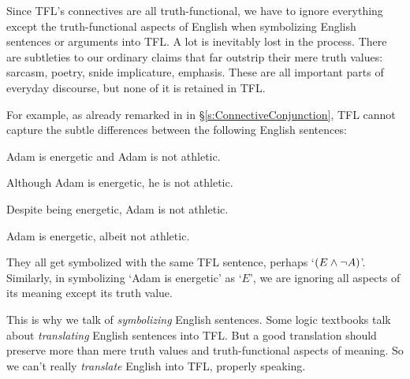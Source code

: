 Since TFL's connectives are all truth-functional, we have to ignore everything except the truth-functional aspects of English when symbolizing English sentences or arguments into TFL.  A lot is inevitably lost in the process.  There are subtleties to our ordinary claims that far outstrip their mere truth values: sarcasm, poetry, snide implicature, emphasis.  These are all important parts of everyday discourse, but none of it is retained in TFL.

For example, as already remarked in in \S\ref{s:ConnectiveConjunction}, TFL cannot capture the subtle differences between the following English sentences:
	\begin{earg}
		\item Adam is energetic and Adam is not athletic.
		\item Although Adam is energetic, he is not athletic.
		\item Despite being energetic, Adam is not athletic.
		\item Adam is energetic, albeit not athletic.
	\end{earg}
They all get symbolized with the same TFL sentence, perhaps `$(E \wedge \neg A)$'.  Similarly, in symbolizing `Adam is energetic' as `$E$', we are ignoring all aspects of its meaning except its truth value.

This is why we talk of \emph{symbolizing} English sentences. Some logic textbooks talk about \emph{translating} English sentences into TFL. But a good translation should preserve more than mere truth values and truth-functional aspects of meaning.  So we can't really \emph{translate} English into TFL, properly speaking.

%



